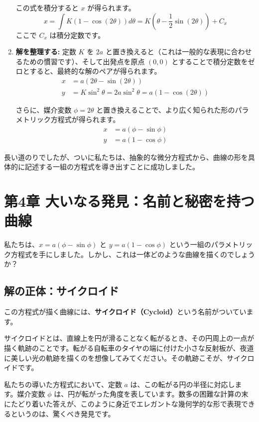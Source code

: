 \documentclass[12pt,a4paper]{ltjsarticle}
\begin{document}
\begin{enumerate}
この式を積分すると $x$ が得られます。
\begin{equation}
x = \int K(1 - \cos(2\theta))d\theta = K\left(\theta - \frac{1}{2}\sin(2\theta)\right) + C_x
\end{equation}
ここで $C_x$ は積分定数です。

\item \textbf{解を整理する:} 定数 $K$ を $2a$ と置き換えると（これは一般的な表現に合わせるための慣習です）、そして出発点を原点 $(0,0)$ とすることで積分定数をゼロとすると、最終的な解のペアが得られます。
\begin{align}
x &= a(2\theta - \sin(2\theta)) \\
y &= K\sin^2\theta = 2a\sin^2\theta = a(1 - \cos(2\theta))
\end{align}

さらに、媒介変数 $\phi = 2\theta$ と置き換えることで、より広く知られた形のパラメトリック方程式が得られます。
\begin{align}
x &= a(\phi - \sin\phi) \\
y &= a(1 - \cos\phi)
\end{align}
\end{enumerate}

長い道のりでしたが、ついに私たちは、抽象的な微分方程式から、曲線の形を具体的に記述する一組の方程式を導き出すことに成功しました。

\section{第4章 大いなる発見：名前と秘密を持つ曲線}

私たちは、$x = a(\phi - \sin\phi)$ と $y = a(1 - \cos\phi)$ という一組のパラメトリック方程式を手にしました。しかし、これは一体どのような曲線を描くのでしょうか？

\subsection{解の正体：サイクロイド}

この方程式が描く曲線には、\textbf{サイクロイド（Cycloid）}という名前がついています。

サイクロイドとは、直線上を円が滑ることなく転がるとき、その円周上の一点が描く軌跡のことです。転がる自転車のタイヤの端に付けた小さな反射板が、夜道に美しい光の軌跡を描くのを想像してみてください。その軌跡こそが、サイクロイドです。

私たちの導いた方程式において、定数 $a$ は、この転がる円の半径に対応します。媒介変数 $\phi$ は、円が転がった角度を表しています。数多の困難な計算の末にたどり着いた答えが、このように身近でエレガントな幾何学的な形で表現できるというのは、驚くべき発見です。
\end{document}
